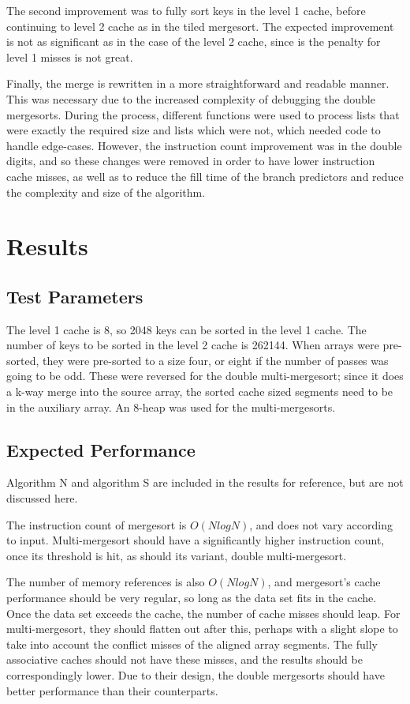 The second improvement was to fully sort keys in the level 1 cache, before
continuing to level 2 cache as in the tiled mergesort. The expected improvement
is not as significant as in the case of the level 2 cache, since is the penalty
for level 1 misses is not great.

Finally, the merge is rewritten in a more straightforward and readable manner. This
was necessary due to the increased complexity of debugging the double mergesorts.
During the process, different functions were used to process lists that were
exactly the required size and lists which were not, which needed code to handle
edge-cases. However, the instruction count improvement was in the double digits,
and so these changes were removed in order to have lower instruction cache
misses, as well as to reduce the fill time of the branch predictors and reduce
the complexity and size of the algorithm.

\section{Results}
\subsection{Test Parameters}
The level 1 cache is 8, so 2048 keys can be sorted in the level 1 cache.
The number of keys to be sorted in the level 2 cache is 262144.  When arrays
were pre-sorted, they were pre-sorted to a size four, or eight if the number of passes
was going to be odd. These were reversed for the double multi-mergesort; since
it does a k-way merge into the source array, the sorted cache sized segments
need to be in the auxiliary array. An 8-heap was used for the multi-mergesorts.

\subsection{Expected Performance}

Algorithm N and algorithm S are included in the results for reference, but are
not discussed here.

The instruction count of mergesort is $O(NlogN)$, and does not vary
according to input. Multi-mergesort should have a significantly higher
instruction count, once its threshold is hit, as should its variant, double
multi-mergesort.

The number of memory references is also $O(NlogN)$, and mergesort's cache
performance should be very regular, so long as the data set fits in the cache. Once
the data set exceeds the cache, the number of cache misses should leap. For
multi-mergesort, they should flatten out after this, perhaps with a slight
slope to take into account the conflict misses of the aligned array segments. The
fully associative caches should not have these misses, and the results should be
correspondingly lower. Due to their design, the double mergesorts should have
better performance than their counterparts.

